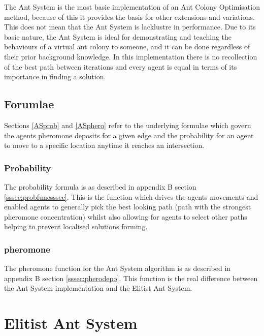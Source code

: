 The Ant System is the most basic implementation of an Ant Colony Optimisation method, because of this it provides the basis for other extensions and variations. This does not mean that the Ant System is lacklustre in performance. Due to its basic nature, the Ant System is ideal for demonstrating and teaching the behaviours of a virtual ant colony to someone, and it can be done regardless of their prior background knowledge. In this implementation there is no recollection of the best path between iterations and every agent is equal in terms of its importance in finding a solution.

\subsection{Forumlae}

Sections \ref{ASprob} and \ref{ASphero} refer to the underlying formulae which govern the agents pheromone deposits for a given edge and the probability for an agent to move to a specific location anytime it reaches an intersection.

\subsubsection{Probability}

The probability formula is as described in appendix B section \ref{sssec:probfuncsssec}. This is the function which drives the agents movements and enabled agents to generally pick the best looking path (path with the strongest pheromone concentration) whilst also allowing for agents to select other paths helping to prevent localised solutions forming.

\label{ASprob}

\subsubsection{pheromone}

The pheromone function for the Ant System algorithm is as described in appendix B section \ref{sssec:pherodepo}. This function is the real difference between the Ant System implementation and the Elitist Ant System.

\label{ASphero}

\section{Elitist Ant System}

